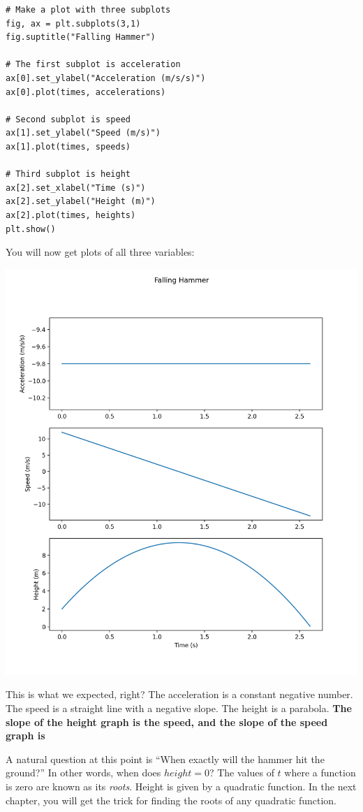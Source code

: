 \begin{Verbatim}
# Make a plot with three subplots
fig, ax = plt.subplots(3,1)
fig.suptitle("Falling Hammer")

# The first subplot is acceleration
ax[0].set_ylabel("Acceleration (m/s/s)")
ax[0].plot(times, accelerations)

# Second subplot is speed
ax[1].set_ylabel("Speed (m/s)")
ax[1].plot(times, speeds)

# Third subplot is height
ax[2].set_xlabel("Time (s)")
ax[2].set_ylabel("Height (m)")
ax[2].plot(times, heights)
plt.show()
\end{Verbatim}

You will now get plots of all three variables:

\includegraphics[width=0.8\linewidth]{stackedplot.png}

This is what we expected, right? The acceleration is a constant negative 
number. The speed is a straight line with a negative slope. The height is a 
parabola. \textbf{The slope of the height graph is the speed, and the slope of the speed graph is }

A natural question at this point is ``When exactly will the hammer hit the
ground?''  In other words, when does $height = 0$? The values of $t$ where a 
function is zero are known as its \textit{roots}. Height is given by a quadratic 
function. In the next chapter, you will get the trick for finding the roots of 
any quadratic function.
